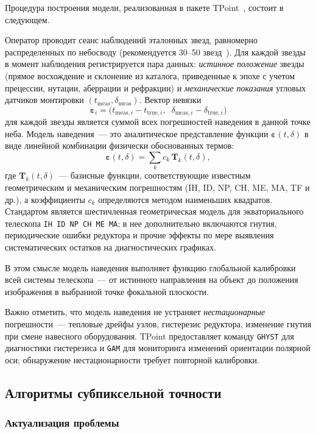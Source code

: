 Процедура построения модели, реализованная в пакете TPoint~\cite{TPoint_Wallace}, состоит в следующем.

Оператор проводит сеанс наблюдений эталонных звезд, равномерно распределенных по небосводу (рекомендуется 30--50 звезд~\cite{TPoint_Wallace}). Для каждой звезды в момент наблюдения регистрируется пара данных: \textit{истинное положение} звезды (прямое восхождение и склонение из каталога, приведенные к эпохе с учетом прецессии, нутации, аберрации и рефракции) и \textit{механические показания} угловых датчиков монтировки $(t_{\mathrm{meas}}, \delta_{\mathrm{meas}})$. Вектор невязки
$$
\boldsymbol{\varepsilon}_i = \bigl(t_{\mathrm{meas},i} - t_{\mathrm{true},i},\;\;
\delta_{\mathrm{meas},i} - \delta_{\mathrm{true},i}\bigr)
$$
для каждой звезды является суммой всех погрешностей наведения в данной точке неба. Модель наведения~--- это аналитическое представление функции $\boldsymbol{\varepsilon}(t, \delta)$ в виде линейной комбинации физически обоснованных термов:
\[
\boldsymbol{\varepsilon}(t,\delta) = \sum_{k} c_k \, \mathbf{T}_k(t, \delta),
\]
где $\mathbf{T}_k(t, \delta)$~--- базисные функции, соответствующие известным геометрическим и механическим погрешностям (IH, ID, NP, CH, ME, MA, TF и др.), а коэффициенты $c_k$ определяются методом наименьших квадратов. Стандартом является шестичленная геометрическая модель для экваториального телескопа \texttt{IH ID NP CH ME MA}; в нее дополнительно включаются гнутия, периодические ошибки редуктора и прочие эффекты по мере выявления систематических остатков на диагностических графиках.

В этом смысле модель наведения выполняет функцию глобальной калибровки всей системы телескопа~--- от истинного направления на объект до положения изображения в выбранной точке фокальной плоскости.

Важно отметить, что модель наведения не устраняет \textit{нестационарные} погрешности~--- тепловые дрейфы узлов, гистерезис редуктора, изменение гнутия при смене навесного оборудования. TPoint предоставляет команду \texttt{GHYST} для диагностики гистерезиса и \texttt{GAM} для мониторинга изменений ориентации полярной оси; обнаружение нестационарности требует повторной калибровки.

\subsection{Алгоритмы субпиксельной точности}

\subsubsection{Актуализация проблемы}

